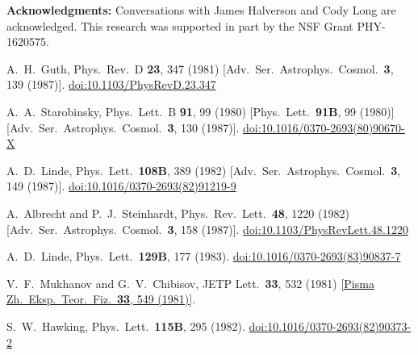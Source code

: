 \documentclass[12pt]{article}
\begin{document}
\textbf{Acknowledgments:}
Conversations with James Halverson and Cody Long are acknowledged.
This research was supported in part by the NSF Grant PHY-1620575.

\clearpage

\begin{thebibliography}{99}
  A.~H.~Guth,
  Phys.\ Rev.\ D {\bf 23}, 347 (1981)
  [Adv.\ Ser.\ Astrophys.\ Cosmol.\  {\bf 3}, 139 (1987)].
  \href{https://dx.doi.org/10.1103/PhysRevD.23.347}{doi:10.1103/PhysRevD.23.347}

  A.~A.~Starobinsky,
  Phys.\ Lett.\ B {\bf 91}, 99 (1980)
  [Phys.\ Lett.\  {\bf 91B}, 99 (1980)]
  [Adv.\ Ser.\ Astrophys.\ Cosmol.\  {\bf 3}, 130 (1987)].
  \href{https://dx.doi.org/10.1016/0370-2693(80)90670-X}{doi:10.1016/0370-2693(80)90670-X}

  A.~D.~Linde,
  Phys.\ Lett.\  {\bf 108B}, 389 (1982)
  [Adv.\ Ser.\ Astrophys.\ Cosmol.\  {\bf 3}, 149 (1987)].
  \href{https://dx.doi.org/10.1016/0370-2693(82)91219-9}{doi:10.1016/0370-2693(82)91219-9}

  A.~Albrecht and P.~J.~Steinhardt,
  Phys.\ Rev.\ Lett.\  {\bf 48}, 1220 (1982)
  [Adv.\ Ser.\ Astrophys.\ Cosmol.\  {\bf 3}, 158 (1987)].
  \href{https://dx.doi.org/10.1103/PhysRevLett.48.1220}{doi:10.1103/PhysRevLett.48.1220}

  A.~D.~Linde,
  Phys.\ Lett.\  {\bf 129B}, 177 (1983).
  \href{https://dx.doi.org/10.1016/0370-2693(83)90837-7}{doi:10.1016/0370-2693(83)90837-7}

  V.~F.~Mukhanov and G.~V.~Chibisov,
  JETP Lett.\  {\bf 33}, 532 (1981)
  \href{http://inspirehep.net/record/170051/files/article_23079.pdf?version=1}{[Pisma Zh.\ Eksp.\ Teor.\ Fiz.\  {\bf 33}, 549 (1981)]}.

  S.~W.~Hawking,
  Phys.\ Lett.\  {\bf 115B}, 295 (1982).
  \href{https://dx.doi.org/10.1016/0370-2693(82)90373-2}{doi:10.1016/0370-2693(82)90373-2}


\end{thebibliography}
\end{document}
